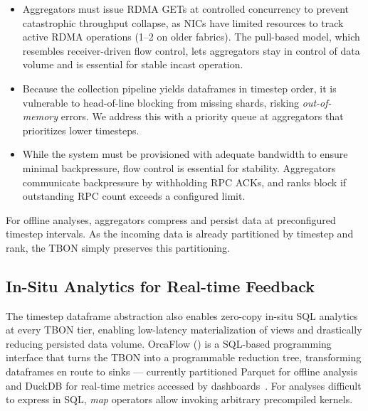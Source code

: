 \begin{itemize}[leftmargin=*]
  \item Aggregators must issue RDMA GETs at controlled concurrency to prevent catastrophic
        throughput collapse, as NICs have limited resources to track active RDMA operations (1--2 on older fabrics).
        The pull-based model, which resembles receiver-driven flow control, lets aggregators stay in
        control of data volume and is essential for stable incast operation.

  \item Because the collection pipeline yields dataframes in timestep order, it is vulnerable to
        head-of-line blocking from missing shards, risking \emph{out-of-memory} errors.
        We address this with a priority queue at aggregators that prioritizes lower timesteps.

  \item While the system must be provisioned with adequate bandwidth to ensure
        minimal backpressure, flow control is essential for stability.
        Aggregators communicate backpressure by withholding RPC ACKs, and ranks block if outstanding RPC
        count exceeds a configured limit.
\end{itemize}

For offline analyses, aggregators compress and persist data at preconfigured timestep intervals.
As the incoming data is already partitioned by timestep and rank, the TBON simply preserves this
partitioning.



\subsection{In-Situ Analytics for Real-time Feedback}
\label{sec:orca:des_insitu}

\figDesignPlan{}

The timestep dataframe abstraction also enables zero-copy in-situ SQL analytics at every TBON tier,
enabling low-latency materialization of views and drastically reducing persisted data volume.
OrcaFlow () is a SQL-based programming interface that turns the TBON into a
programmable reduction tree, transforming dataframes en route to sinks --- currently partitioned
Parquet for offline analysis and DuckDB for real-time metrics accessed by
dashboards~\cite{:GrafanaDashboard}.
For analyses difficult to express in SQL, \emph{map} operators allow invoking arbitrary precompiled
kernels.

